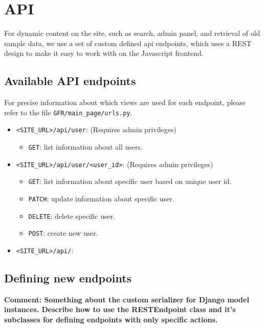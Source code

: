 \documentclass{article}
\newcommand{\makecomment}[1]{{\color{red} \bf Comment: #1}}
\begin{document}
\section{API}
For dynamic content on the site, such as search, admin panel, and retrieval of old sample data, we use a set of custom defined api endpoints, which uses a REST design to make it easy to work with on the Javascript frontend.

\subsection{Available API endpoints}
For precise information about which views are used for each endpoint, please refer to the file \texttt{GFR/main\_page/urls.py}.

\begin{itemize}
	\item \texttt{<SITE\_URL>/api/user}: (Requires admin privileges)
	\begin{itemize}
		\item \texttt{GET}: list information about all users.
	\end{itemize}
	
	\item \texttt{<SITE\_URL>/api/user/<user\_id>}: (Requires admin privileges)
	\begin{itemize}
		\item \texttt{GET}: list information about specific user based on unique user id.
		\item \texttt{PATCH}: update information about specific user.
		\item \texttt{DELETE}: delete specific user.
		\item \texttt{POST}: create new user.
	\end{itemize}

	\item \texttt{<SITE\_URL>/api/}:
\end{itemize}

\subsection{Defining new endpoints}
\makecomment{Something about the custom serializer for Django model instances. Describe how to use the RESTEndpoint class and it's subclasses for defining endpoints with only specific actions.}
\end{document}
